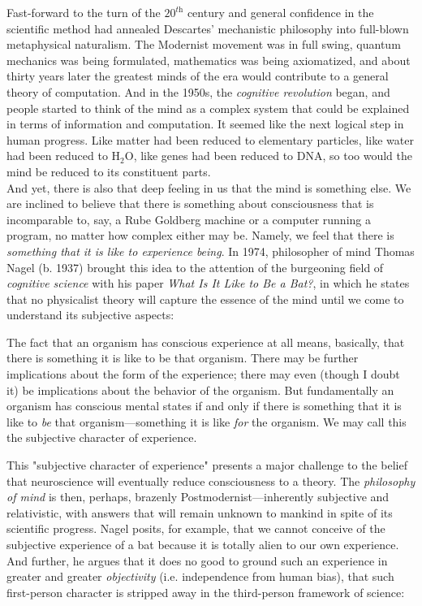 \begin{tcolorbox}[breakable, enhanced, colback=textbook-blue, sharp corners]
	Fast-forward to the turn of the $20^\textit{th}$ century and general confidence in the scientific method had annealed Descartes' mechanistic philosophy into full-blown metaphysical naturalism. The Modernist movement was in full swing, quantum mechanics was being formulated, mathematics was being axiomatized, and about thirty years later the greatest minds of the era would contribute to a general theory of computation. And in the 1950s, the \textit{cognitive revolution} began, and people started to think of the mind as a complex system that could be explained in terms of information and computation. It seemed like the next logical step in human progress. Like matter had been reduced to elementary particles, like water had been reduced to H$_2$O, like genes had been reduced to DNA, so too would the mind be reduced to its constituent parts. \\
	
	And yet, there is also that deep feeling in us that the mind is something else. We are inclined to believe that there is something about consciousness that is incomparable to, say, a Rube Goldberg machine or a computer running a program, no matter how complex either may be. Namely, we feel that there is \textit{something that it is like to experience being}. In 1974, philosopher of mind Thomas Nagel (b. 1937) brought this idea to the attention of the burgeoning field of \textit{cognitive science} with his paper \textit{What Is It Like to Be a Bat?}, in which he states that no physicalist theory will capture the essence of the mind until we come to understand its subjective aspects: \\
	
	\begin{displayquote}
		The fact that an organism has conscious experience at all means, basically, that there is something it is like to be that organism. There may be further implications about the form of the experience; there may even (though I doubt it) be implications about the behavior of the organism. But fundamentally an organism has conscious mental states if and only if there is something that it is like to \textit{be} that organism---something it is like \textit{for} the organism. We may call this the subjective character of experience. \\
	\end{displayquote}
	
	This "subjective character of experience" presents a major challenge to the belief that neuroscience will eventually reduce consciousness to a theory. The \textit{philosophy of mind} is then, perhaps, brazenly Postmodernist---inherently subjective and relativistic, with answers that will remain unknown to mankind in spite of its scientific progress. Nagel posits, for example, that we cannot conceive of the subjective experience of a bat because it is totally alien to our own experience. And further, he argues that it does no good to ground such an experience in greater and greater \textit{objectivity} (i.e. independence from human bias), that such first-person character is stripped away in the third-person framework of science: \\
	

\end{tcolorbox}
